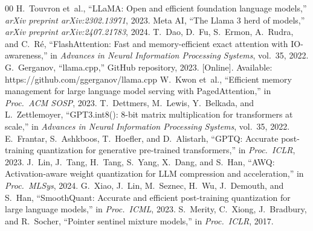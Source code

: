 \documentclass[conference]{IEEEtran}
\begin{document}
\begin{thebibliography}{00}
 H.~Touvron et~al., ``LLaMA: Open and efficient foundation language models,'' \textit{arXiv preprint arXiv:2302.13971}, 2023.
 Meta AI, ``The Llama 3 herd of models,'' \textit{arXiv preprint arXiv:2407.21783}, 2024.
 T.~Dao, D.~Fu, S.~Ermon, A.~Rudra, and C.~R\'{e}, ``FlashAttention: Fast and memory-efficient exact attention with IO-awareness,'' in \textit{Advances in Neural Information Processing Systems}, vol.~35, 2022.
 G.~Gerganov, ``llama.cpp,'' GitHub repository, 2023. [Online]. Available: https://github.com/ggerganov/llama.cpp
 W.~Kwon et~al., ``Efficient memory management for large language model serving with PagedAttention,'' in \textit{Proc.\ ACM SOSP}, 2023.
 T.~Dettmers, M.~Lewis, Y.~Belkada, and L.~Zettlemoyer, ``GPT3.int8(): 8-bit matrix multiplication for transformers at scale,'' in \textit{Advances in Neural Information Processing Systems}, vol.~35, 2022.
 E.~Frantar, S.~Ashkboos, T.~Hoefler, and D.~Alistarh, ``GPTQ: Accurate post-training quantization for generative pre-trained transformers,'' in \textit{Proc.\ ICLR}, 2023.
 J.~Lin, J.~Tang, H.~Tang, S.~Yang, X.~Dang, and S.~Han, ``AWQ: Activation-aware weight quantization for LLM compression and acceleration,'' in \textit{Proc.\ MLSys}, 2024.
 G.~Xiao, J.~Lin, M.~Seznec, H.~Wu, J.~Demouth, and S.~Han, ``SmoothQuant: Accurate and efficient post-training quantization for large language models,'' in \textit{Proc.\ ICML}, 2023.
 S.~Merity, C.~Xiong, J.~Bradbury, and R.~Socher, ``Pointer sentinel mixture models,'' in \textit{Proc.\ ICLR}, 2017.
\end{thebibliography}
\end{document}
